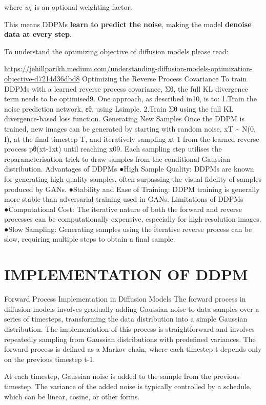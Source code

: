 \documentclass[
]{book}
\begin{document}
where \(w_t\) is an optional weighting factor.

This means DDPMs \textbf{learn to predict the noise}, making the model \textbf{denoise data at every step}.

To understand the optimizing objective of diffusion models please read:

\url{https://jehillparikh.medium.com/understanding-diffusion-models-optimization-objective-d7214d36dbd8}
Optimizing the Reverse Process Covariance
To train DDPMs with a learned reverse process covariance, Σθ, the full KL divergence term needs to be optimised9. One approach, as described in10, is to:
1.Train the noise prediction network, εθ, using Lsimple.
2.Train Σθ using the full KL divergence-based loss function.
Generating New Samples
Once the DDPM is trained, new images can be generated by starting with random noise, xT \textasciitilde{} N(0, I), at the final timestep T, and iteratively sampling xt-1 from the learned reverse process pθ(xt-1\textbar xt) until reaching x09. Each sampling step utilises the reparameterisation trick to draw samples from the conditional Gaussian distribution.
Advantages of DDPMs
●High Sample Quality: DDPMs are known for generating high-quality samples, often surpassing the visual fidelity of samples produced by GANs.
●Stability and Ease of Training: DDPM training is generally more stable than adversarial training used in GANs.
Limitations of DDPMs
●Computational Cost: The iterative nature of both the forward and reverse processes can be computationally expensive, especially for high-resolution images.
●Slow Sampling: Generating samples using the iterative reverse process can be slow, requiring multiple steps to obtain a final sample.

\section{IMPLEMENTATION OF DDPM}\label{implementation-of-ddpm}

Forward Process Implementation in Diffusion Models
The forward process in diffusion models involves gradually adding Gaussian noise to data samples over a series of timesteps, transforming the data distribution into a simple Gaussian distribution. The implementation of this process is straightforward and involves repeatedly sampling from Gaussian distributions with predefined variances.
The forward process is defined as a Markov chain, where each timestep t depends only on the previous timestep t-1.

At each timestep, Gaussian noise is added to the sample from the previous timestep. The variance of the added noise is typically controlled by a schedule, which can be linear, cosine, or other forms.
\end{document}
